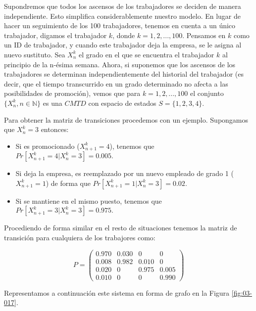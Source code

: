 \documentclass[
]{book}
\providecommand{\tightlist}{%
  \setlength{\itemsep}{0pt}\setlength{\parskip}{0pt}}
\theoremstyle{definition}
\theoremstyle{definition}
\theoremstyle{definition}
\theoremstyle{definition}
\theoremstyle{remark}
\begin{document}
Supondremos que todos los ascensos de los trabajadores se deciden de manera independiente. Esto simplifica considerablemente nuestro modelo. En lugar de hacer un seguimiento de los 100 trabajadores, tenemos en cuenta a un único trabajador, digamos el trabajador \(k\), donde \(k = 1, 2,...,100\). Pensamos en \(k\) como un ID de trabajador, y cuando este trabajador deja la empresa, se le asigna al nuevo sustituto. Sea \(X_n^k\) el grado en el que se encuentra el trabajador \(k\) al principio de la n-ésima semana. Ahora, si suponemos que los ascensos de los trabajadores se determinan independientemente del historial del trabajador (es decir, que el tiempo transcurrido en un grado determinado no afecta a las posibilidades de promoción), vemos que para \(k = 1, 2,...,100\) el conjunto \(\{X_n^k, n \in \mathbb{N}\}\) es una \(CMTD\) con espacio de estados \(S =\{1, 2, 3, 4\}\).

Para obtener la matriz de transiciones procedemos con un ejemplo. Supongamos que \(X_n^k = 3\) entonces:

\begin{itemize}
\tightlist
\item
  Si es promocionado (\(X_{n+1}^k = 4\)), tenemos que \(Pr[X_{n+1}^k = 4 | X_n^k = 3] = 0.005.\)
\item
  Si deja la empresa, es reemplazado por un nuevo empleado de grado 1 (\(X_{n+1}^k = 1\)) de forma que \(Pr[X_{n+1}^k = 1 | X_n^k = 3] = 0.02.\)
\item
  Si se mantiene en el mismo puesto, tenemos que \(Pr[X_{n+1}^k = 3 | X_n^k = 3] = 0.975.\)
\end{itemize}

Procediendo de forma similar en el resto de situaciones tenemos la matriz de transición para cualquiera de los trabajores como:

\[P = 
\begin{pmatrix}
0.970 & 0.030 & 0 & 0\\
0.008 & 0.982 & 0.010 & 0\\
0.020 & 0 & 0.975 & 0.005\\
0.010 & 0 & 0 & 0.990
\end{pmatrix}\]

Representamos a continuación este sistema en forma de grafo en la Figura \ref{fig:03-017}.
\end{document}

